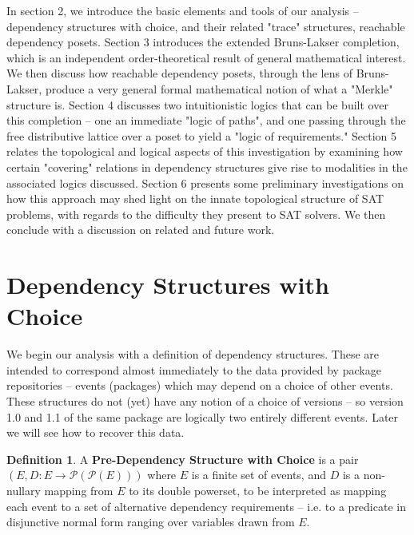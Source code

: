 \documentclass[hoptionsi,review,format=acmsmall]{acmart}
\theoremstyle{definition}
\newtheorem{definition}{Definition}[section]
\newcommand{\Pc}{\mathcal{P}}
\begin{document}
In section 2, we introduce the basic elements and tools of our analysis -- dependency structures with choice, and their related "trace" structures, reachable dependency posets. Section 3 introduces the extended Bruns-Lakser completion, which is an independent order-theoretical result of general mathematical interest. We then discuss how reachable dependency posets, through the lens of Bruns-Lakser, produce a very general formal mathematical notion of what a "Merkle" structure is. Section 4 discusses two intuitionistic logics that can be built over this completion -- one an immediate "logic of paths", and one passing through the free distributive lattice over a poset to yield a "logic of requirements." Section 5 relates the topological and logical aspects of this investigation by examining how certain "covering" relations in dependency structures give rise to modalities in the associated logics discussed. Section 6 presents some preliminary investigations on how this approach may shed light on the innate topological structure of SAT problems, with regards to the difficulty they present to SAT solvers. We then conclude with a discussion on related and future work.

\section{Dependency Structures with Choice}
We begin our analysis with a definition of dependency structures. These are intended to correspond almost immediately to the data provided by package repositories -- events (packages) which may depend on a choice of other events. These structures do not (yet) have any notion of a choice of versions -- so version 1.0 and 1.1 of the same package are logically two entirely different events. Later we will see how to recover this data.

\begin{definition}
A \textbf{Pre-Dependency Structure with Choice} is a pair \((E, D : E \rightarrow \Pc(\Pc(E)))\) where \(E\) is a finite set of events, and \(D\) is a non-nullary mapping from \(E\) to its double powerset, to be interpreted as mapping each event to a set of alternative dependency requirements -- i.e. to a predicate in disjunctive normal form ranging over variables drawn from \(E\).
\end{definition}
\end{document}
